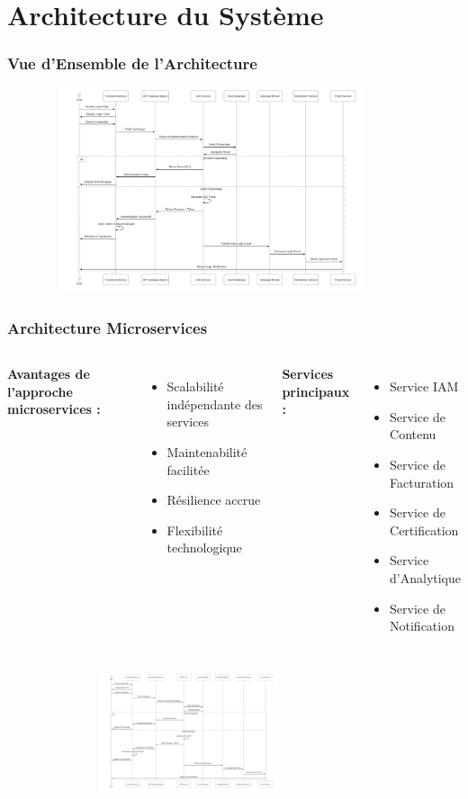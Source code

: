 \documentclass{beamer}
\begin{document}
\section{Architecture du Système}

\begin{frame}
\frametitle{Vue d'Ensemble de l'Architecture}
\begin{center}
    \includegraphics[width=0.9\textwidth,height=6cm,keepaspectratio]{Editor _ Mermaid Chart-2025-06-06-214630.png}
\end{center}
\end{frame}

\begin{frame}
\frametitle{Architecture Microservices}
\begin{columns}
\textbf{Avantages de l'approche microservices :}
\begin{itemize}
    \item Scalabilité indépendante des services
    \item Maintenabilité facilitée
    \item Résilience accrue
    \item Flexibilité technologique
\end{itemize}

\textbf{Services principaux :}
\begin{itemize}
    \item Service IAM
    \item Service de Contenu
    \item Service de Facturation
    \item Service de Certification
    \item Service d'Analytique
    \item Service de Notification
\end{itemize}
\end{columns}

\vspace{0.3cm}
\begin{center}
    \includegraphics[width=0.8\textwidth,height=3.5cm,keepaspectratio]{images/sequence_diagram.png}
\end{center}
\end{frame}
\end{document}
